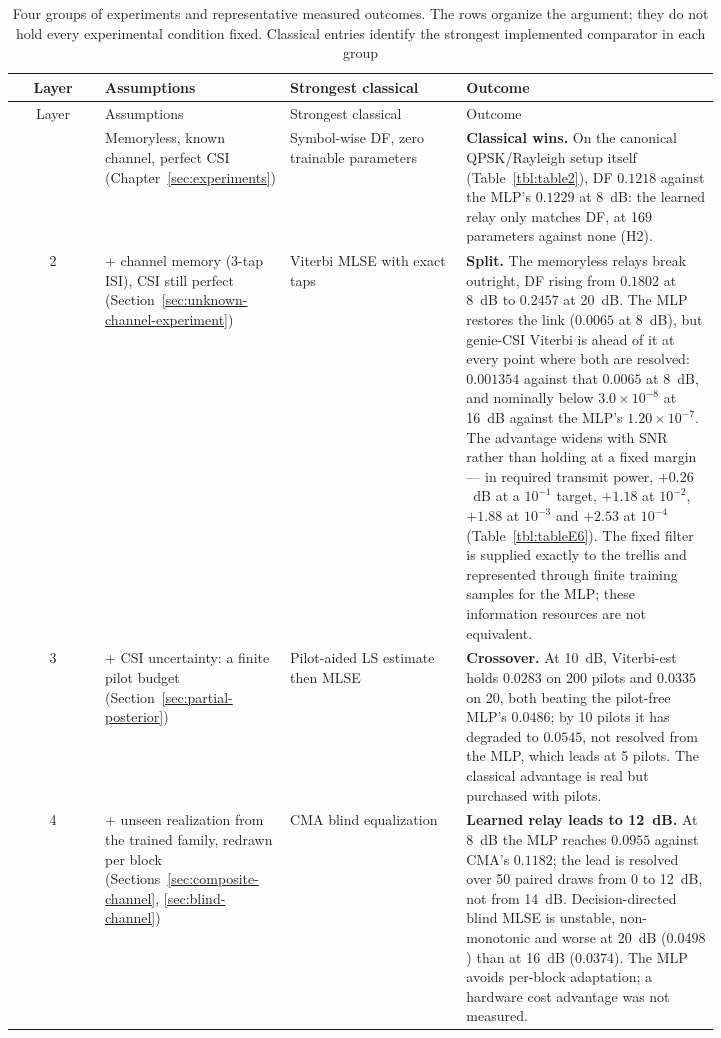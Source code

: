 \begin{longtable}[]{@{}c>{\raggedright\arraybackslash}p{0.21\linewidth}>{\raggedright\arraybackslash}p{0.25\linewidth}>{\raggedright\arraybackslash}p{0.36\linewidth}@{}}
\caption[The four layers of the argument]{Four groups of experiments and representative measured outcomes. The rows organize the argument; they do not hold every experimental condition fixed. Classical entries identify the strongest implemented comparator in each group}\label{tbl:layers}\tabularnewline
\toprule\noalign{}
Layer & Assumptions & Strongest classical & Outcome \\
\midrule\noalign{}
\endfirsthead
\toprule\noalign{}
Layer & Assumptions & Strongest classical & Outcome \\
\midrule\noalign{}
\endhead
\bottomrule\noalign{}
\endlastfoot
1 & Memoryless, known channel, perfect CSI (Chapter~\ref{sec:experiments}) & Symbol-wise DF, zero trainable parameters & \textbf{Classical wins.} On the canonical QPSK/Rayleigh setup itself (Table~\ref{tbl:table2}), DF $0.1218$ against the MLP's $0.1229$ at 8~dB: the learned relay only matches DF, at 169 parameters against none (H2). \\
2 & \;+ channel memory (3-tap ISI), CSI still perfect (Section~\ref{sec:unknown-channel-experiment}) & Viterbi MLSE with exact taps & \textbf{Split.} The memoryless relays break outright, DF rising from $0.1802$ at 8~dB to $0.2457$ at 20~dB. The MLP restores the link ($0.0065$ at 8~dB), but genie-CSI Viterbi is ahead of it at every point where both are resolved: $0.001354$ against that $0.0065$ at 8~dB, and nominally below $3.0\times10^{-8}$ at 16~dB against the MLP's $1.20\times10^{-7}$. The advantage widens with SNR rather than holding at a fixed margin --- in required transmit power, $+0.26$~dB at a $10^{-1}$ target, $+1.18$ at $10^{-2}$, $+1.88$ at $10^{-3}$ and $+2.53$ at $10^{-4}$ (Table~\ref{tbl:tableE6}). The fixed filter is supplied exactly to the trellis and represented through finite training samples for the MLP; these information resources are not equivalent. \\
3 & \;+ CSI uncertainty: a finite pilot budget (Section~\ref{sec:partial-posterior}) & Pilot-aided LS estimate then MLSE & \textbf{Crossover.} At 10~dB, Viterbi-est holds $0.0283$ on 200 pilots and $0.0335$ on 20, both beating the pilot-free MLP's $0.0486$; by 10 pilots it has degraded to $0.0545$, not resolved from the MLP, which leads at 5 pilots. The classical advantage is real but purchased with pilots. \\
4 & \;+ unseen realization from the trained family, redrawn per block (Sections~\ref{sec:composite-channel}, \ref{sec:blind-channel}) & CMA blind equalization & \textbf{Learned relay leads to 12~dB.} At 8~dB the MLP reaches $0.0955$ against CMA's $0.1182$; the lead is resolved over 50 paired draws from 0 to 12~dB, not from 14~dB. Decision-directed blind MLSE is unstable, non-monotonic and worse at 20~dB ($0.0498$) than at 16~dB ($0.0374$). The MLP avoids per-block adaptation; a hardware cost advantage was not measured. \\
\end{longtable}

